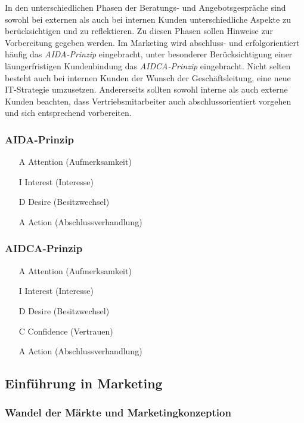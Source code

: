 \documentclass[a4paper, 12pt]{report}
\begin{document}
\begin{multicols}{2}
In den unterschiedlichen Phasen der Beratungs- und Angebotsgespräche sind sowohl
bei externen als auch bei internen Kunden unterschiedliche Aspekte zu
berücksichtigen und zu reflektieren. Zu diesen Phasen sollen Hinweise zur
Vorbereitung gegeben werden. Im Marketing wird abschluss- und erfolgorientiert
häufig das \emph{AIDA-Prinzip} eingebracht, unter besonderer Berücksichtigung
einer läungerfristigen Kundenbindung das \emph{AIDCA-Prinzip} eingebracht. Nicht
selten besteht auch bei internen Kunden der Wunsch der Geschäftsleitung, eine
neue IT-Strategie umzusetzen. Andererseits sollten sowohl interne als auch
externe Kunden beachten, dass Vertriebsmitarbeiter auch abschlussorientiert
vorgehen und sich entsprechend vorbereiten. \\

\subsubsection{AIDA-Prinzip}

\begin{itemize}
    \item[A] Attention (Aufmerksamkeit)
    \item[I] Interest (Interesse)
    \item[D] Desire (Besitzwechsel)
    \item[A] Action (Abschlussverhandlung)
\end{itemize}

\subsubsection{AIDCA-Prinzip}

\begin{itemize}
    \item[A] Attention (Aufmerksamkeit)
    \item[I] Interest (Interesse)
    \item[D] Desire (Besitzwechsel)
    \item[C] Confidence (Vertrauen)
    \item[A] Action (Abschlussverhandlung)
\end{itemize}

\subsection{Einführung in Marketing}

\subsubsection{Wandel der Märkte und Marketingkonzeption}


\end{multicols}
\end{document}
